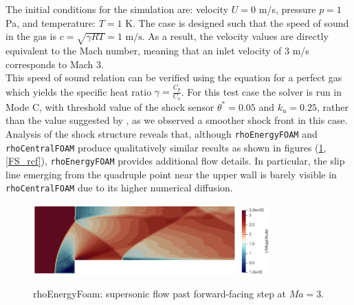 \documentclass[a5paper]{sapthesis}
\begin{document}
	\noindent The initial conditions for the simulation are: velocity  $U = 0$ m/s, pressure $p = 1$ Pa, and temperature: $T = 1$ K. The case is designed such that the speed of sound in the gas is	$c = \sqrt{\gamma R T} = 1 \text{ m/s}$. As a result, the velocity values are directly equivalent to the Mach number, meaning that an inlet velocity of 3 m/s corresponds to Mach 3.
	\\
	This speed of sound relation can be verified using the equation for a perfect gas which yields the specific heat ratio $\gamma = \frac{C_p}{C_v}$. 
	For this test case the solver is run in Mode C, with threshold
	value of the shock sensor $\theta^* = 0.05$ and $k_u = 0.25$, rather than the value suggested by \citet{LIOU_AUSM+-up}, as we observed a smoother shock front in this case.
	Analysis of the shock structure reveals that, although \texttt{rhoEnergyFOAM} and \texttt{rhoCentralFOAM} produce qualitatively similar results as shown in figures (\ref{FS_ref}, \ref{FS_rcf}), \texttt{rhoEnergyFOAM} provides additional flow details. In particular, the slip line emerging from the quadruple point near the upper wall is barely visible in \texttt{rhoCentralFOAM} due to its higher numerical diffusion.
			
	\begin{figure}
		\centering
		\subfloat
		{\includegraphics[width=0.7\textwidth]{Figures/FS_velocity}} \quad 
		\subfloat
		\centering
		{\includegraphics[width=0.1\textwidth, height=0.16\textheight]{Figures/FS_velocitybar}}
		\caption{rhoEnergyFoam: supersonic ﬂow past forward-facing step at $Ma = 3$.}
		\label{FS_ref}
	\end{figure}
	
\end{document}
